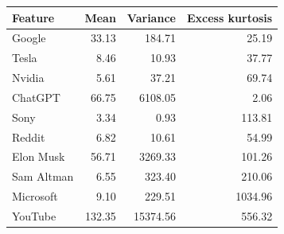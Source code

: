 \begin{tabular}{lrrr}
\toprule
Feature & Mean & Variance & Excess kurtosis \\
\midrule
Google & 33.13 & 184.71 & 25.19 \\
Tesla & 8.46 & 10.93 & 37.77 \\
Nvidia & 5.61 & 37.21 & 69.74 \\
ChatGPT & 66.75 & 6108.05 & 2.06 \\
Sony & 3.34 & 0.93 & 113.81 \\
Reddit & 6.82 & 10.61 & 54.99 \\
Elon Musk & 56.71 & 3269.33 & 101.26 \\
Sam Altman & 6.55 & 323.40 & 210.06 \\
Microsoft & 9.10 & 229.51 & 1034.96 \\
YouTube & 132.35 & 15374.56 & 556.32 \\
\bottomrule
\end{tabular}
